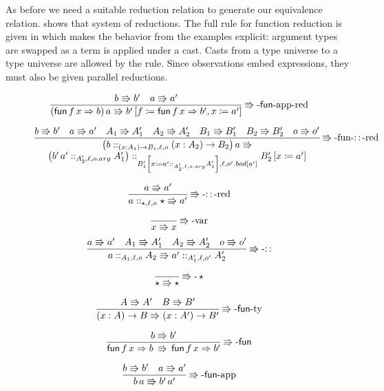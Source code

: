 As before we need a suitable reduction relation to generate our equivalence relation.
 shows that system of reductions.
The full rule for function reduction is given in  which makes the behavior from the examples explicit: argument types are swapped as a term is applied under a cast.
Casts from a type universe to a type universe are allowed by the  rule.
Since observations embed expressions, they must also be given parallel reductions.
 
\begin{figure}
\[
\frac{b\Rrightarrow b'\quad a\Rrightarrow a'}{\left(\mathsf{fun}\,f\,x\Rightarrow b\right)a\Rrightarrow b'\left[f\coloneqq\mathsf{fun}\,f\,x\Rightarrow b',x\coloneqq a'\right]}
\operatorname{\Rrightarrow-\mathsf{fun}-app-red}
\]
 
\[
\frac{b\Rrightarrow b'\quad a\Rrightarrow a'\quad A_{1}\Rrightarrow A_{1}'\quad A_{2}\Rrightarrow A_{2}'\quad B_{1}\Rrightarrow B_{1}'\quad B_{2}\Rrightarrow B_{2}'\quad o\Rrightarrow o'}{\begin{array}{c}
\left(b::_{\left(x:A_{1}\right)\rightarrow B_{1},\ell ,o}\left(x:A_{2}\right)\rightarrow B_{2}\right)a\Rrightarrow\\
\left(b'\,a'::_{A_{2}',\ell,o.arg}A_{1}'\right)::_{B_{1}'\left[x\coloneqq a'::_{A_{2}',\ell,o.arg}A_{1}'\right],\ell ,o'.bod[a']}B_{2}'\left[x\coloneqq a'\right]
\end{array}}
\operatorname{\Rrightarrow-fun-::-red}
\]
 
\[
\frac{a\Rrightarrow a'}{a::_{\star,\ell,o}\star\Rrightarrow a'}
\operatorname{\Rrightarrow-::-red}
\]
 
\[
\frac{\,}{x\Rrightarrow x}
\operatorname{\Rrightarrow-var}
\]
\[
\frac{a\Rrightarrow a'\quad A_{1}\Rrightarrow A_{1}'\quad A_{2}\Rrightarrow A_{2}'\quad o\Rrightarrow o'}{a::_{A_{1},\ell ,o}A_{2}\Rrightarrow a'::_{A_{1}',\ell ,o'}A_{2}'}
\operatorname{\Rrightarrow-::}
\]
 
\[
\frac{\,}{\star\Rrightarrow\star}
\operatorname{\Rrightarrow-}\star
\]
 
\[
\frac{A\Rrightarrow A'\quad B\Rrightarrow B'}{\left(x:A\right)\rightarrow B\Rrightarrow\left(x:A'\right)\rightarrow B'}
\operatorname{\Rrightarrow-\mathsf{fun}-ty}
\]
 
\[
\frac{b\Rrightarrow b'}{\mathsf{fun}\,f\,x\Rightarrow b\,\Rrightarrow\,\mathsf{fun}\,f\,x\Rightarrow b'}
\operatorname{\Rrightarrow-\mathsf{fun}}
\]
 
\[
\frac{b\Rrightarrow b'\quad a\Rrightarrow a'}{b\,a\Rrightarrow b'\,a'}
\operatorname{\Rrightarrow-\mathsf{fun}-app}
\]
 

\end{figure}
